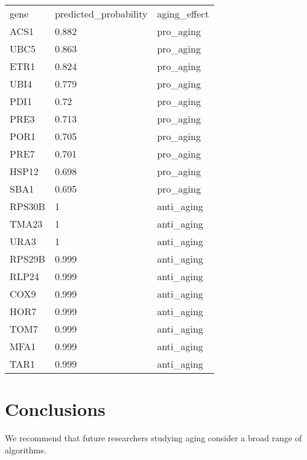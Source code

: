 \documentclass{article}
\begin{document}
\begin{table}[ht]
\begin{tabular}{lll}
gene   & predicted\_probability & aging\_effect \\
ACS1   & 0.882                  & pro\_aging    \\
UBC5   & 0.863                  & pro\_aging    \\
ETR1   & 0.824                  & pro\_aging    \\
UBI4   & 0.779                  & pro\_aging    \\
PDI1   & 0.72                   & pro\_aging    \\
PRE3   & 0.713                  & pro\_aging    \\
POR1   & 0.705                  & pro\_aging    \\
PRE7   & 0.701                  & pro\_aging    \\
HSP12  & 0.698                  & pro\_aging    \\
SBA1   & 0.695                  & pro\_aging    \\
RPS30B & 1                      & anti\_aging   \\
TMA23  & 1                      & anti\_aging   \\
URA3   & 1                      & anti\_aging   \\
RPS29B & 0.999                  & anti\_aging   \\
RLP24  & 0.999                  & anti\_aging   \\
COX9   & 0.999                  & anti\_aging   \\
HOR7   & 0.999                  & anti\_aging   \\
TOM7   & 0.999                  & anti\_aging   \\
MFA1   & 0.999                  & anti\_aging   \\
TAR1   & 0.999                  & anti\_aging
\end{tabular}
\end{table}

\newpage

\section{Conclusions}

We recommend that future researchers studying aging consider a broad range of algorithms.



\end{document}
